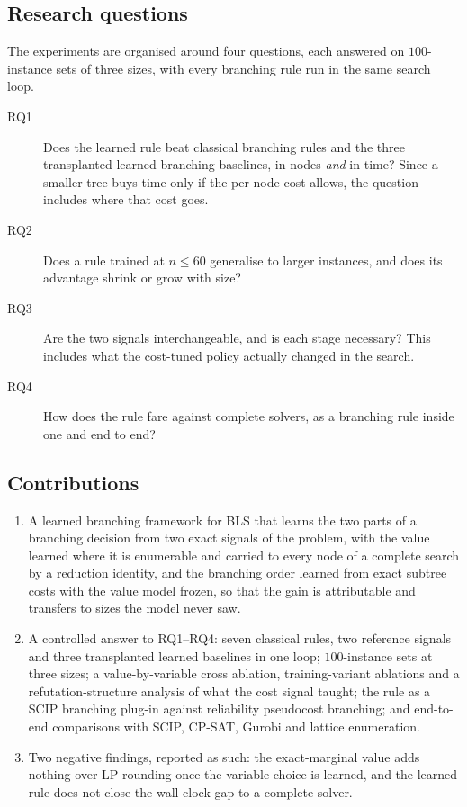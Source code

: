 \documentclass[final,5p,times,twocolumn,authoryear]{elsarticle}
\begin{document}
\subsection{Research questions}
The experiments are organised around four questions, each answered on $100$-instance sets of three sizes, with every branching rule run in the same search loop.
\begin{description}
\item[RQ1] Does the learned rule beat classical branching rules and the three transplanted learned-branching baselines, in nodes \emph{and} in time? Since a smaller tree buys time only if the per-node cost allows, the question includes where that cost goes.
\item[RQ2] Does a rule trained at $n\le60$ generalise to larger instances, and does its advantage shrink or grow with size?
\item[RQ3] Are the two signals interchangeable, and is each stage necessary? This includes what the cost-tuned policy actually changed in the search.
\item[RQ4] How does the rule fare against complete solvers, as a branching rule inside one and end to end?
\end{description}

\subsection{Contributions}
\begin{enumerate}
\item A learned branching framework for BLS that learns the two parts of a branching decision from two exact signals of the problem, with the value learned where it is enumerable and carried to every node of a complete search by a reduction identity, and the branching order learned from exact subtree costs with the value model frozen, so that the gain is attributable and transfers to sizes the model never saw.
\item A controlled answer to RQ1--RQ4: seven classical rules, two reference signals and three transplanted learned baselines in one loop; $100$-instance sets at three sizes; a value-by-variable cross ablation, training-variant ablations and a refutation-structure analysis of what the cost signal taught; the rule as a SCIP branching plug-in against reliability pseudocost branching; and end-to-end comparisons with SCIP, CP-SAT, Gurobi and lattice enumeration.
\item Two negative findings, reported as such: the exact-marginal value adds nothing over LP rounding once the variable choice is learned, and the learned rule does not close the wall-clock gap to a complete solver.
\end{enumerate}
\end{document}
